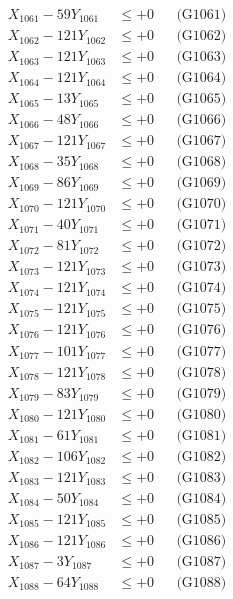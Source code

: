 \documentclass[a4paper,10pt]{article}
\begin{document}
{\begin{align}
\allowbreak
X_{1061} - 59Y_{1061} &\leq +0 && \text{(G1061)} \\
X_{1062} - 121Y_{1062} &\leq +0 && \text{(G1062)} \\
X_{1063} - 121Y_{1063} &\leq +0 && \text{(G1063)} \\
X_{1064} - 121Y_{1064} &\leq +0 && \text{(G1064)} \\
X_{1065} - 13Y_{1065} &\leq +0 && \text{(G1065)} \\
X_{1066} - 48Y_{1066} &\leq +0 && \text{(G1066)} \\
X_{1067} - 121Y_{1067} &\leq +0 && \text{(G1067)} \\
X_{1068} - 35Y_{1068} &\leq +0 && \text{(G1068)} \\
X_{1069} - 86Y_{1069} &\leq +0 && \text{(G1069)} \\
X_{1070} - 121Y_{1070} &\leq +0 && \text{(G1070)} \\
\allowbreak
X_{1071} - 40Y_{1071} &\leq +0 && \text{(G1071)} \\
X_{1072} - 81Y_{1072} &\leq +0 && \text{(G1072)} \\
X_{1073} - 121Y_{1073} &\leq +0 && \text{(G1073)} \\
X_{1074} - 121Y_{1074} &\leq +0 && \text{(G1074)} \\
X_{1075} - 121Y_{1075} &\leq +0 && \text{(G1075)} \\
X_{1076} - 121Y_{1076} &\leq +0 && \text{(G1076)} \\
X_{1077} - 101Y_{1077} &\leq +0 && \text{(G1077)} \\
X_{1078} - 121Y_{1078} &\leq +0 && \text{(G1078)} \\
X_{1079} - 83Y_{1079} &\leq +0 && \text{(G1079)} \\
X_{1080} - 121Y_{1080} &\leq +0 && \text{(G1080)} \\
\allowbreak
X_{1081} - 61Y_{1081} &\leq +0 && \text{(G1081)} \\
X_{1082} - 106Y_{1082} &\leq +0 && \text{(G1082)} \\
X_{1083} - 121Y_{1083} &\leq +0 && \text{(G1083)} \\
X_{1084} - 50Y_{1084} &\leq +0 && \text{(G1084)} \\
X_{1085} - 121Y_{1085} &\leq +0 && \text{(G1085)} \\
X_{1086} - 121Y_{1086} &\leq +0 && \text{(G1086)} \\
X_{1087} - 3Y_{1087} &\leq +0 && \text{(G1087)} \\
X_{1088} - 64Y_{1088} &\leq +0 && \text{(G1088)} \\

\end{align}}
\end{document}
